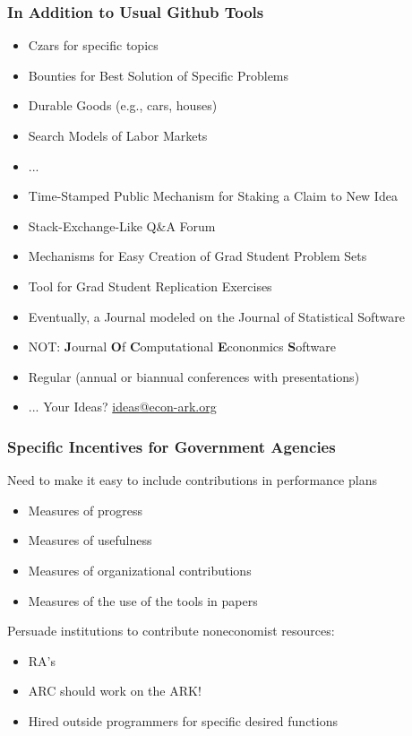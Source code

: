 \documentclass[public]{beamer}
\begin{document}
\begin{frame}
\frametitle{In Addition to Usual Github Tools}

\begin{itemize}
\item Czars for specific topics
\item Bounties for Best Solution of Specific Problems
\bi
\item Durable Goods (e.g., cars, houses)
\item Search Models of Labor Markets
\item ... 
\ei
\item Time-Stamped Public Mechanism for Staking a Claim to New Idea
\item Stack-Exchange-Like Q\&A Forum
\item Mechanisms for Easy Creation of Grad Student Problem Sets
\item Tool for Grad Student Replication Exercises
\item Eventually, a Journal modeled on the Journal of Statistical Software
\bi
\item NOT: {\bf J}ournal {\bf O}f {\bf C}omputational {\bf E}cononmics {\bf S}oftware
\ei
\item Regular (annual or biannual conferences with presentations)
\item ... Your Ideas?  \href{mailto:ideas@econ-ark.org}{ideas@econ-ark.org}
\end{itemize}

\end{frame}

\begin{frame}
\frametitle{Specific Incentives for Government Agencies}

Need to make it easy to include contributions in performance plans
\begin{itemize}
\item Measures of progress
\item Measures of usefulness
\item Measures of organizational contributions
\item Measures of the use of the tools in papers
\end{itemize}

Persuade institutions to contribute noneconomist resources:
\begin{itemize}
\item RA's
\item ARC should work on the ARK!
\item Hired outside programmers for specific desired functions
\end{itemize}

\end{frame}
\end{document}
